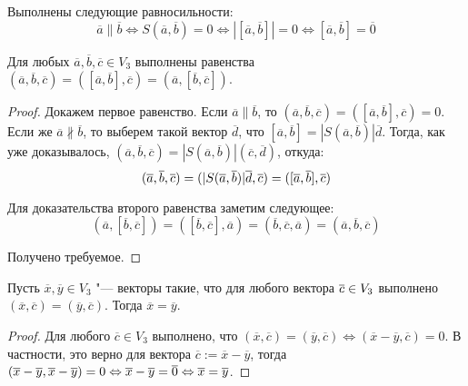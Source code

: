 \begin{note}
	Выполнены следующие равносильности:
	\[\overline{a} \parallel \overline{b} \Leftrightarrow S(\overline{a}, \overline{b}) = 0 \Leftrightarrow |[\overline{a}, \overline{b}]| = 0 \Leftrightarrow [\overline{a}, \overline{b}] = \overline{0}\]
\end{note}

\begin{theorem}
	Для любых $\overline a, \overline b, \overline c \in V_3$ выполнены равенства $(\overline{a}, \overline{b}, \overline{c}) = ([\overline{a}, \overline{b}], \overline{c}) = (\overline{a}, [\overline{b}, \overline{c}])$.
\end{theorem}

\begin{proof}
	Докажем первое равенство. Если $\overline{a} \parallel \overline{b}$, то $(\overline{a}, \overline{b}, \overline{c}) = ([\overline{a}, \overline{b}], \overline{c}) = 0$. Если же $\overline{a} \nparallel \overline{b}$, то выберем такой вектор $\overline{d}$, что $[\overline{a}, \overline{b}] = |S(\overline{a}, \overline{b})|\overline{d}$. Тогда, как уже доказывалось, $(\overline{a}, \overline{b}, \overline{c}) = |S(\overline{a}, \overline{b})|(\overline{c}, \overline{d})$, откуда:
	\[(\overline{a}, \overline{b}, \overline{c}) \hm{=} (|S(\overline{a}, \overline{b})|\overline{d}, \overline{c}) = ([\overline{a}, \overline{b}], \overline{c})\]
	
	Для доказательства второго равенства заметим следующее: \[(\overline{a}, [\overline{b}, \overline{c}]) = ([\overline{b}, \overline{c}], \overline{a}) = (\overline{b}, \overline{c}, \overline{a}) = (\overline{a}, \overline{b}, \overline{c})\]
	
	Получено требуемое.
\end{proof}

\begin{proposition}
	Пусть $\overline{x}, \overline{y} \in V_3$ "--- векторы такие, что для любого вектора $\overline{c} \hm{\in} V_3$ выполнено $(\overline{x}, \overline{c}) = (\overline{y}, \overline{c})$. Тогда $\overline{x} = \overline{y}$.
\end{proposition}

\begin{proof}
	Для любого $\overline{c} \in V_3$ выполнено, что $(\overline{x}, \overline{c}) = (\overline{y}, \overline{c}) \Leftrightarrow (\overline{x} - \overline{y}, \overline{c}) = 0$. В частности, это верно для вектора $\overline{c} := \overline{x} - \overline{y}$, тогда $(\overline{x} - \overline{y}, \overline{x} - \overline{y}) = 0 \hm{\Leftrightarrow} \overline{x} - \overline{y} = \overline{0} \Leftrightarrow  \overline{x} = \overline{y}$.
\end{proof}

